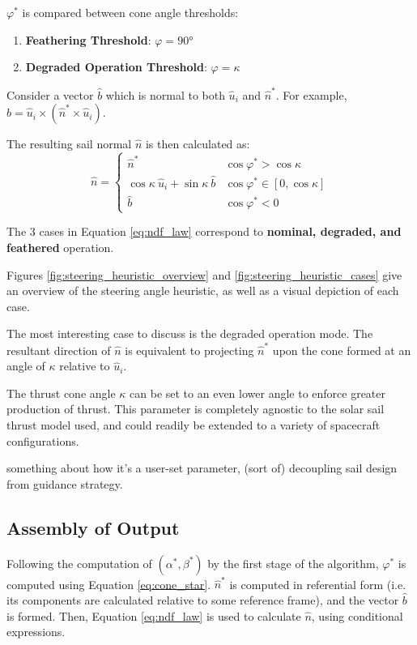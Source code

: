 \(\varphi^*\) is compared between cone angle thresholds:
\begin{enumerate}
  \item \textbf{Feathering Threshold}: \(\varphi = \ang{90}\)
  \item \textbf{Degraded Operation Threshold}: \(\varphi = \kappa\)
\end{enumerate}

Consider a vector \(\hat{b}\) which is normal to both \(\hat{u}_i\) and \(\hat{n}^*\). For example, \(\hat{b} = \hat{u}_i \times (\hat{n}^* \times \hat{u}_i)\).

The resulting sail normal \(\hat{n}\) is then calculated as:
\begin{equation}
  \hat{n} = \begin{cases}
    \hat{n}^*                                       & \cos \varphi^* > \cos \kappa          \\
    \cos \kappa \ \hat{u}_i + \sin \kappa \ \hat{b} & \cos \varphi^* \in  [ 0, \cos \kappa] \\
    \hat{b}                                         & \cos \varphi^* < 0
  \end{cases}
  \label{eq:ndf_law}
\end{equation}

The 3 cases in Equation \ref{eq:ndf_law} correspond to \textbf{nominal, degraded, and feathered} operation.




Figures \ref{fig:steering_heuristic_overview} and \ref{fig:steering_heuristic_cases} give an overview of the steering angle heuristic, as well as a visual depiction of each case.

The most interesting case to discuss is the degraded operation mode. The resultant direction of \(\hat{n}\) is equivalent to projecting \(\hat{n}^*\) upon the cone formed at an angle of \(\kappa\) relative to \(\hat{u}_i\).

The thrust cone angle \(\kappa\) can be set to an even lower angle to enforce greater production of thrust. This parameter is completely agnostic to the solar sail thrust model used, and could readily be extended to a variety of spacecraft configurations.

something about how it's a user-set parameter, (sort of) decoupling sail design from guidance strategy.

\subsection{Assembly of Output}
Following the computation of \((\alpha^*, \beta^*)\) by the first stage of the algorithm, \(\varphi^*\) is computed using Equation \ref{eq:cone_star}. \(\hat{n}^*\) is computed in referential form (i.e. its components are calculated relative to some reference frame), and the vector \(\hat{b}\) is formed. Then, Equation \ref{eq:ndf_law} is used to calculate \(\hat{n}\), using conditional expressions.


